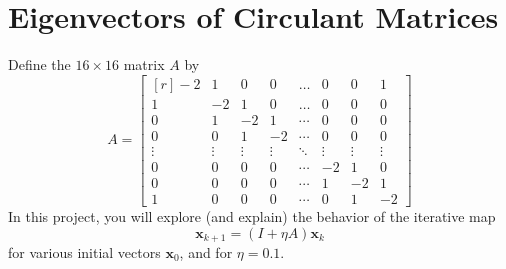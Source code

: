 \section{Eigenvectors of Circulant Matrices}


Define the $16 \times 16$ matrix $A$ by
\begin{equation}
A = \begin{bmatrix*}[r] -2 & 1 & 0 & 0 & \dots & 0 & 0 & 1 \\ 1 & -2 & 1 & 0 & \dots& 0 & 0 & 0 \\ 0 & 1 & -2 & 1 & \cdots&0 & 0 & 0 \\ 0 & 0 & 1 & -2 & \cdots&0 & 0 & 0 \\ \vdots & \vdots & \vdots & \vdots & \ddots & \vdots & \vdots & \vdots \\ 0 & 0 & 0 & 0 & \cdots & -2 & 1 & 0 \\ 0 & 0 & 0 & 0 & \cdots & 1 & -2 & 1\\ 1 & 0 & 0 & 0 & \cdots & 0 & 1 & -2 \end{bmatrix*}
\end{equation}
In this project, you will explore (and explain) the behavior of the iterative map
    \begin{equation}
      \label{eq:eigen-iterative}
      \bm{x}_{k+1} = \left(I + \eta A\right) \bm{x}_{k}
    \end{equation}
   for various initial vectors $\bm{x}_0$, and for $\eta = 0.1$. 
